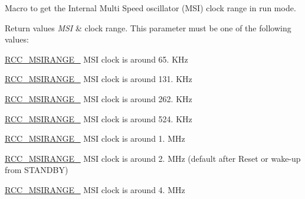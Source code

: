 Macro to get the Internal Multi Speed oscillator (M\-S\-I) clock range in run mode. 


\begin{DoxyRetVals}{Return values}
{\em M\-S\-I} & clock range. This parameter must be one of the following values\-: \begin{DoxyItemize}
\item \hyperlink{group___r_c_c___m_s_i___clock___range_ga3a266a56e6a43bdaef4bbcc1eee4c360}{R\-C\-C\-\_\-\-M\-S\-I\-R\-A\-N\-G\-E\-\_} M\-S\-I clock is around 65. K\-Hz \item \hyperlink{group___r_c_c___m_s_i___clock___range_ga90601d6a9beb6a00245ecbf193d0ece5}{R\-C\-C\-\_\-\-M\-S\-I\-R\-A\-N\-G\-E\-\_} M\-S\-I clock is around 131. K\-Hz \item \hyperlink{group___r_c_c___m_s_i___clock___range_gafa12a5d5063914b4aa66c8f12324926e}{R\-C\-C\-\_\-\-M\-S\-I\-R\-A\-N\-G\-E\-\_} M\-S\-I clock is around 262. K\-Hz \item \hyperlink{group___r_c_c___m_s_i___clock___range_ga2eb0f8e9e5800747454d52f5497dea57}{R\-C\-C\-\_\-\-M\-S\-I\-R\-A\-N\-G\-E\-\_} M\-S\-I clock is around 524. K\-Hz \item \hyperlink{group___r_c_c___m_s_i___clock___range_gab5ca16a71f018ae2ceb5bcef29434f1c}{R\-C\-C\-\_\-\-M\-S\-I\-R\-A\-N\-G\-E\-\_} M\-S\-I clock is around 1. M\-Hz \item \hyperlink{group___r_c_c___m_s_i___clock___range_gabcd068b50d4fdfb3529272fbb169ebb1}{R\-C\-C\-\_\-\-M\-S\-I\-R\-A\-N\-G\-E\-\_} M\-S\-I clock is around 2. M\-Hz (default after Reset or wake-\/up from S\-T\-A\-N\-D\-B\-Y) \item \hyperlink{group___r_c_c___m_s_i___clock___range_ga7f6e3de13b041244869fba14585c43fe}{R\-C\-C\-\_\-\-M\-S\-I\-R\-A\-N\-G\-E\-\_} M\-S\-I clock is around 4. M\-Hz \end{DoxyItemize}
\\
\hline
\end{DoxyRetVals}
